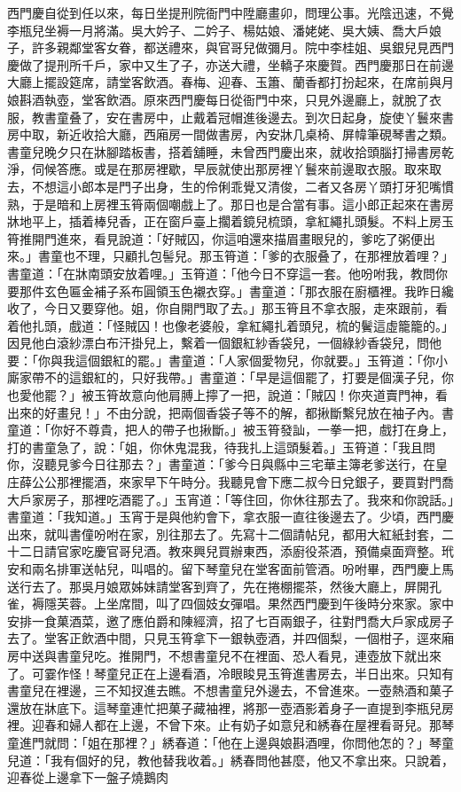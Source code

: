 \begin{showcontents}{}
西門慶自從到任以來，每日坐提刑院衙門中陞廳畫卯，問理公事。光陰迅速，不覺李瓶兒坐褥一月將滿。吳大妗子、二妗子、楊姑娘、潘姥姥、吳大姨、喬大戶娘子，許多親鄰堂客女眷，都送禮來，與官哥兒做彌月。院中李桂姐、吳銀兒見西門慶做了提刑所千戶，家中又生了子，亦送大禮，坐轎子來慶賀。西門慶那日在前邊大廳上擺設筵席，請堂客飲酒。春梅、迎春、玉簫、蘭香都打扮起來，在席前與月娘斟酒執壺，堂客飲酒。原來西門慶每日從衙門中來，只見外邊廳上，就脫了衣服，教書童叠了，安在書房中，止戴着冠帽進後邊去。到次日起身，旋使丫鬟來書房中取，新近收拾大廳，西廂房一間做書房，內安牀几桌椅、屏幃筆硯琴書之類。書童兒晚夕只在牀腳踏板書，搭着舖睡，未曾西門慶出來，就收拾頭腦打掃書房乾淨，伺候答應。或是在那房裡歇，早辰就使出那房裡丫鬟來前邊取衣服。取來取去，不想這小郎本是門子出身，生的伶俐乖覺又清俊，二者又各房丫頭打牙犯嘴慣熟，于是暗和上房裡玉筲兩個嘲戲上了。那日也是合當有事。這小郎正起來在書房牀地平上，插着棒兒香，正在窗戶臺上擱着鏡兒梳頭，拿紅繩扎頭髮。不料上房玉筲推開門進來，看見說道：「好賊囚，你這咱還來描眉畫眼兒的，爹吃了粥便出來。」書童也不理，只顧扎包髻兒。那玉筲道：「爹的衣服叠了，在那裡放着哩？」書童道：「在牀南頭安放着哩。」玉筲道：「他今日不穿這一套。他吩咐我，教問你要那件玄色匾金補子系布圓領玉色襯衣穿。」書童道：「那衣服在廚櫃裡。我昨日纔收了，今日又要穿他。姐，你自開門取了去。」那玉筲且不拿衣服，走來跟前，看着他扎頭，戲道：「怪賊囚！也像老婆般，拿紅繩扎着頭兒，梳的鬢這虛籠籠的。」因見他白滾紗漂白布汗掛兒上，繫着一個銀紅紗香袋兒，一個綠紗香袋兒，問他要：「你與我這個銀紅的罷。」書童道：「人家個愛物兒，你就要。」玉筲道：「你小廝家帶不的這銀紅的，只好我帶。」書童道：「早是這個罷了，打要是個漢子兒，你也愛他罷？」被玉筲故意向他肩膊上擰了一把，說道：「賊囚！你夾道賣門神，看出來的好畫兒！」不由分說，把兩個香袋子等不的解，都揪斷繫兒放在袖子內。書童道：「你好不尊貴，把人的帶子也揪斷。」被玉筲發訕，一拳一把，戲打在身上，打的書童急了，說：「姐，你休鬼混我，待我扎上這頭髮着。」玉筲道：「我且問你，沒聽見爹今日往那去？」書童道：「爹今日與縣中三宅華主簿老爹送行，在皇庄薛公公那裡擺酒，來家早下午時分。我聽見會下應二叔今日兌銀子，要買對門喬大戶家房子，那裡吃酒罷了。」玉宵道：「等住回，你休往那去了。我來和你說話。」書童道：「我知道。」玉宵于是與他約會下，拿衣服一直往後邊去了。少頃，西門慶出來，就叫書僮吩咐在家，別往那去了。先寫十二個請帖兒，都用大紅紙封套，二十二日請官家吃慶官哥兒酒。教來興兒買辦東西，添廚役茶酒，預備桌面齊整。玳安和兩名排軍送帖兒，叫唱的。留下琴童兒在堂客面前管酒。吩咐畢，西門慶上馬送行去了。那吳月娘眾姊妹請堂客到齊了，先在捲棚擺茶，然後大廳上，屏開孔雀，褥隱芙蓉。上坐席間，叫了四個妓女彈唱。果然西門慶到午後時分來家。家中安排一食菓酒菜，邀了應伯爵和陳經濟，招了七百兩銀子，往對門喬大戶家成房子去了。堂客正飲酒中間，只見玉筲拿下一銀執壺酒，并四個梨，一個柑子，逕來廂房中送與書童兒吃。推開門，不想書童兒不在裡面、恐人看見，連壺放下就出來了。可霎作怪！琴童兒正在上邊看酒，冷眼睃見玉筲進書房去，半日出來。只知有書童兒在裡邊，三不知扠進去瞧。不想書童兒外邊去，不曾進來。一壺熱酒和菓子還放在牀底下。這琴童連忙把菓子藏袖裡，將那一壺酒影着身子一直提到李瓶兒房裡。迎春和婦人都在上邊，不曾下來。止有奶子如意兒和綉春在屋裡看哥兒。那琴童進門就問：「姐在那裡？」綉春道：「他在上邊與娘斟酒哩，你問他怎的？」琴童兒道：「我有個好的兒，教他替我收着。」綉春問他甚麼，他又不拿出來。只說着，迎春從上邊拿下一盤子燒鵝肉 
\end{showcontents}
